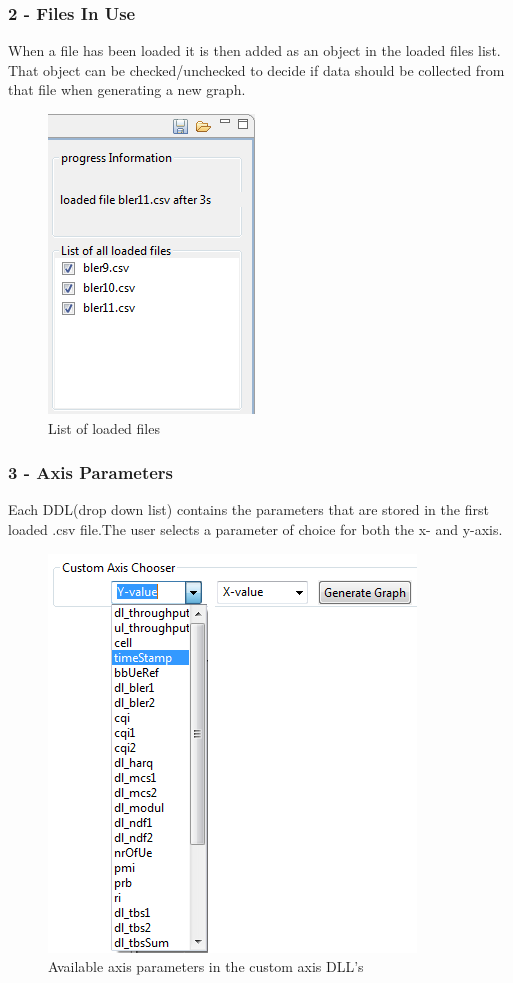 \documentclass[cropmarks, frame, english]{idamasterthesis}
\begin{document}
\subsubsection{2 - Files In Use}
When a file has been loaded it is then added as an object in the loaded files list. That object can be checked/unchecked to decide if data should be collected from that file when generating a new graph.
	
\begin{figure}[H]
\includegraphics[scale=0.7]{AdvancedView_LoadedFiles}
\centering
\caption{List of loaded files}
\end{figure}

\subsubsection{3 - Axis Parameters}
Each DDL(drop down list) contains the parameters that are stored in the first loaded .csv file.The user selects a parameter of choice for both the x- and y-axis.

\begin{figure}[H]
\includegraphics[scale=0.7]{Axis_Parameters}
\centering
\caption{Available axis parameters in the custom axis DLL's}
\end{figure}
\end{document}
